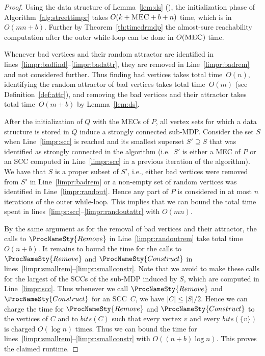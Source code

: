 \documentclass[11pt,letterpaper]{article}
\newcommand{\set}[1]{\{#1\}}
\newcommand{\mdp}{P\xspace}
\newcommand{\scc}{C\xspace}
\newcommand{\remove}{\ProcNameSty{Remove}}
\newcommand{\construct}{\ProcNameSty{Construct}}
\newcommand{\bits}{\mathit{bits}\xspace}
\begin{document}
\begin{proof}
	Using the data structure of Lemma~\ref{lem:ds} (\cite{HenzingerT96}),
	the initialization phase of Algorithm~\ref{alg:streettimpr} takes
	$O(k + \textsc{MEC} + b + n)$ time, which is in $O(mn + b)$. Further by 
	Theorem~\ref{th:timedrmdp} the almost-sure reachability computation
	after the outer while-loop can be done in $O(\textsc{MEC})$ time. 
	
	Whenever bad vertices and their random attractor are identified in 
	lines~\ref{limpr:badfind}--\ref{limpr:badattr}, they are removed in 
	Line~\ref{limpr:badrem} and not considered further. Thus finding bad 
	vertices takes total time~$O(n)$,
	identifying the random attractor of bad vertices takes total time~$O(m)$ (see 
	Definition~\ref{def:attr}), and removing the bad vertices and their attractor 
	takes total time~$O(m + b)$ by Lemma~\ref{lem:ds}.
	
	After the initialization of $Q$ with the MECs of $\mdp$, all vertex sets 
	for which a data structure is stored in $Q$ induce a strongly connected sub-MDP.
	Consider the set $S$ when Line~\ref{limpr:scc} is reached and its smallest superset
	$S' \supseteq S$ that was identified as strongly connected in the algorithm
	(i.e.\ $S'$ is either a MEC of $\mdp$ or an SCC computed in Line~\ref{limpr:scc}
	in a previous iteration of the algorithm). We have that $S$ is a proper 
	subset of $S'$, i.e., either bad vertices were 
	removed from $S'$ in Line~\ref{limpr:badrem} or a non-empty set of random
	vertices was identified in Line~\ref{limpr:randout}. Hence any part of $\mdp$
	is considered in at most $n$ iterations of the outer while-loop. This implies
	that we can bound the total time spent in 
	lines~\ref{limpr:scc}--\ref{limpr:randoutattr} with $O(mn)$.
	
	By the same argument as for the removal of bad vertices and their attractor,
	the calls to $\remove$ in Line~\ref{limpr:randoutrem} take total time $O(n + b)$.
	It remains to bound the time for the calls to $\remove$ and $\construct$
	in lines~\ref{limpr:smallrem}--\ref{limpr:smallconstr}. Note that we avoid to
	make these calls for the largest of the SCCs of the sub-MDP induced by $S$,
	which are computed in Line~\ref{limpr:scc}.
	Thus whenever we call $\remove$ and $\construct$ for an SCC~$\scc$, we have 
	$\lvert \scc \rvert \le \lvert S \rvert /2$. Hence 
	we can charge the time for $\remove$ and $\construct$ to the vertices of $\scc$
	and to $\bits(\scc)$ such that every vertex $v$ and every $\bits(\set{v})$ is 
	charged $O(\log n)$ times. Thus we can bound the time for 
	lines~\ref{limpr:smallrem}--\ref{limpr:smallconstr} with $O((n + b) \log n)$.
	This proves the claimed runtime.
\end{proof}
\end{document}
